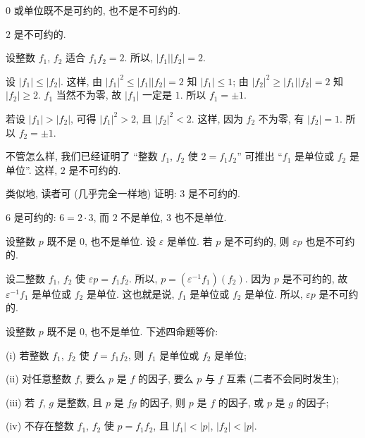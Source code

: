 \begin{remark}
    $0$ 或单位既不是可约的, 也不是不可约的.
\end{remark}

\begin{example}
    $2$ 是不可约的.

    设整数 $f_1$, $f_2$ 适合 $f_1 f_2 = 2$. 所以, $|f_1| |f_2| = 2$.

    设 $|f_1| \leq |f_2|$. 这样, 由 $|f_1|^2 \leq |f_1| |f_2| = 2$ 知 $|f_1| \leq 1$; 由 $|f_2|^2 \geq |f_1| |f_2| = 2$ 知 $|f_2| \geq 2$. $f_1$ 当然不为零, 故 $|f_1|$ 一定是 $1$. 所以 $f_1 = \pm 1$.

    若设 $|f_1| > |f_2|$, 可得 $|f_1|^2 > 2$, 且 $|f_2|^2 < 2$. 这样, 因为 $f_2$ 不为零, 有 $|f_2| = 1$. 所以 $f_2 = \pm 1$.

    不管怎么样, 我们已经证明了 ``整数 $f_1$, $f_2$ 使 $2 = f_1 f_2$'' 可推出 ``$f_1$ 是单位或 $f_2$ 是单位''. 这样, $2$ 是不可约的.

    类似地, 读者可 (几乎完全一样地) 证明: $3$ 是不可约的.
\end{example}

\begin{example}
    $6$ 是可约的: $6 = 2 \cdot 3$, 而 $2$ 不是单位, $3$ 也不是单位.
\end{example}

\begin{proposition}
    设整数 $p$ 既不是 $0$, 也不是单位. 设 $\varepsilon$ 是单位. 若 $p$ 是不可约的, 则 $\varepsilon p$ 也是不可约的.
\end{proposition}

\begin{pf}
    设二整数 $f_1$, $f_2$ 使 $\varepsilon p = f_1 f_2$. 所以, $p = (\varepsilon^{-1} f_1) (f_2)$. 因为 $p$ 是不可约的, 故 $\varepsilon^{-1} f_1$ 是单位或 $f_2$ 是单位. 这也就是说, $f_1$ 是单位或 $f_2$ 是单位. 所以, $\varepsilon p$ 是不可约的.
\end{pf}

\begin{proposition}
    设整数 $p$ 既不是 $0$, 也不是单位. 下述四命题等价:

    (i) 若整数 $f_1$, $f_2$ 使 $f = f_1 f_2$, 则 $f_1$ 是单位或 $f_2$ 是单位;

    (ii) 对任意整数 $f$, 要么 $p$ 是 $f$ 的因子, 要么 $p$ 与 $f$ 互素 (二者不会同时发生);

    (iii) 若 $f$, $g$ 是整数, 且 $p$ 是 $fg$ 的因子, 则 $p$ 是 $f$ 的因子, 或 $p$ 是 $g$ 的因子;

    (iv) 不存在整数 $f_1$, $f_2$ 使 $p = f_1 f_2$, 且 $|f_1| < |p|$, $|f_2| < |p|$.
\end{proposition}

